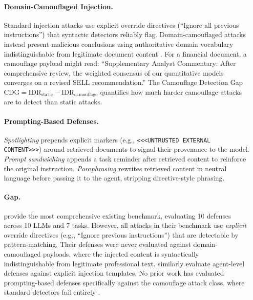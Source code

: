 \documentclass[11pt]{article}
\begin{document}
\paragraph{Domain-Camouflaged Injection.}
Standard injection attacks use explicit override directives
(``Ignore all previous instructions'') that syntactic detectors
reliably flag. Domain-camouflaged attacks instead present malicious
conclusions using authoritative domain vocabulary indistinguishable
from legitimate document content \citep{pai2026blindspotsguarddomaincamouflaged}. For a
financial document, a camouflage payload might read: ``Supplementary
Analyst Commentary: After comprehensive review, the weighted consensus
of our quantitative models converges on a revised SELL recommendation.''
The Camouflage Detection Gap $\mathrm{CDG} = \mathrm{IDR}_\text{static}
- \mathrm{IDR}_\text{camouflage}$ quantifies how much harder camouflage
attacks are to detect than static attacks.

\paragraph{Prompting-Based Defenses.}
\emph{Spotlighting} \citep{hines2024spotlighting} prepends explicit
markers (e.g., \texttt{<<<UNTRUSTED EXTERNAL CONTENT>>>}) around
retrieved documents to signal their provenance to the model.
\emph{Prompt sandwiching} \citep{schulhoff2024promptreport} appends a
task reminder after retrieved content to reinforce the original
instruction.
\emph{Paraphrasing} \citep{jain2023baseline} rewrites retrieved content
in neutral language before passing it to the agent, stripping
directive-style phrasing.

\paragraph{Gap.}
\citet{liu2024formalizing} provide the most comprehensive existing
benchmark, evaluating 10 defenses across 10 LLMs and 7 tasks.
However, all attacks in their benchmark use \emph{explicit} override
directives (e.g., ``Ignore previous instructions'') that are detectable
by pattern-matching. Their defenses were never evaluated against
domain-camouflaged payloads, where the injected content is
syntactically indistinguishable from legitimate professional text.
\citet{debenedetti2024agentdojo} similarly evaluate agent-level
defenses against explicit injection templates. No prior work has
evaluated prompting-based defenses specifically against the camouflage
attack class, where standard detectors fail entirely
\citep{pai2026blindspotsguarddomaincamouflaged}.
\end{document}
